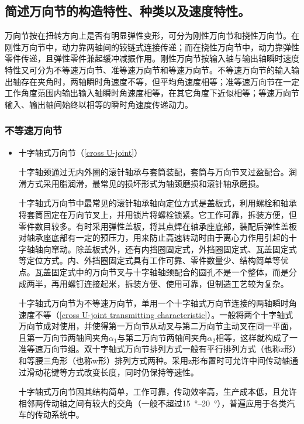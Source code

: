 \documentclass[UTF8]{ctexart}
\numberwithin{figure}{section}
\numberwithin{table}{section}
\begin{document}
\subsection{简述万向节的构造特性、种类以及速度特性。}

万向节按在扭转方向上是否有明显弹性变形，可分为刚性万向节和挠性万向节。在刚性万向节中，动力靠两轴间的铰链式连接传递；而在挠性万向节中，动力靠弹性零件传递，且弹性零件兼起缓冲减振作用。刚性万向节按输入轴与输出轴瞬时速度特性又可分为不等速万向节、准等速万向节和等速万向节。不等速万向节的输入输出轴存在夹角时，两轴瞬时角速度不等，但平均角速度相等；准等速万向节在一定工作角度范围内输出输入轴瞬时角速度相等，在其它角度下近似相等；等速万向节输入、输出轴间始终以相等的瞬时角速度传递动力。

\subsubsection{不等速万向节}

\begin{itemize}
	\item 十字轴式万向节（\cref{cross U-joint}）

	      十字轴颈通过无内外圈的滚针轴承与套筒装配，套筒与万向节叉过盈配合。润滑方式采用脂润滑，最常见的损坏形式为轴颈磨损和滚针轴承磨损。

	      十字轴式万向节中最常见的滚针轴承轴向定位方式是盖板式，利用螺栓和轴承将套筒固定在万向节叉上，并用锁片将螺栓锁紧。它工作可靠，拆装方便，但零件数目较多。有时采用弹性盖板，将其点焊在轴承座底部，装配后弹性盖板对轴承座底部有一定的预压力，用来防止高速转动时由于离心力作用引起的十字轴轴向窜动。除盖板式外，还有内挡圈固定式，外挡圈固定式、瓦盖固定式等定位方式。内、外挡圈固定式具有工作可靠、零件数量少、结构简单等优点。瓦盖固定式中的万向节叉与十字轴轴颈配合的圆孔不是一个整体，而是分成两半，再用螺钉连接起米，拆装方便、使用可靠，但制造工艺较为复杂。

	      十字轴式万向节为不等速万向节，单用一个十字轴式万向节连接的两轴瞬时角速度不等（\cref{cross U-joint transmitting characteristic}）。一般将两个十字轴式万向节成对使用，并使得第一万向节从动叉与第二万向节主动叉在同一平面，且第一万向节两轴间夹角$\alpha_1$与第二万向节两轴间夹角$\alpha_2$相等，这样就构成了一准等速万向节组。双十字轴式万向节排列方式一般有平行排列方式（也称z形）和等腰三角形（也称w形）排列方式两种。采用z形布置时可允许中间传动轴通过滑动花键等方式改变长度，同时仍保持等速性。

	      十字轴式万向节因其结构简单，工作可靠，传动效率高，生产成本低，且允许相邻两传动轴之间有较大的交角（一般不超过\qtyrange[range-phrase = $\,\sim\,$, range-units = single]{15}{20}{\degree}），普遍应用于各类汽车的传动系统中。
\end{itemize}
\end{document}
